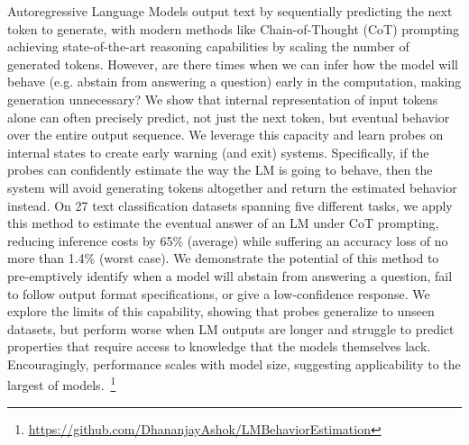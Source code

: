 Autoregressive Language Models output text by sequentially predicting the next token to generate, with modern methods like Chain-of-Thought (CoT) prompting achieving state-of-the-art reasoning capabilities by scaling the number of generated tokens. However, are there times when we can infer how the model will behave (e.g. abstain from answering a question) early in the computation, making generation unnecessary? We show that internal representation of input tokens alone can often precisely predict, not just the next token, but eventual behavior over the entire output sequence. We leverage this capacity and learn probes on internal states to create early warning (and exit) systems. Specifically, if the probes can confidently estimate the way the LM is going to behave, then the system will avoid generating tokens altogether and return the estimated behavior instead. On 27 text classification datasets spanning five different tasks, we apply this method to estimate the eventual answer of an LM under CoT prompting, reducing inference costs by 65\% (average) while suffering an accuracy loss of no more than 1.4\% (worst case). We demonstrate the potential of this method to pre-emptively identify when a model will abstain from answering a question, fail to follow output format specifications, or give a low-confidence response. We explore the limits of this capability, showing that probes generalize to unseen datasets, but perform worse when LM outputs are longer and struggle to predict properties that require access to knowledge that the models themselves lack. Encouragingly, performance scales with model size, suggesting applicability to the largest of models.~\footnote{\url{https://github.com/DhananjayAshok/LMBehaviorEstimation}}